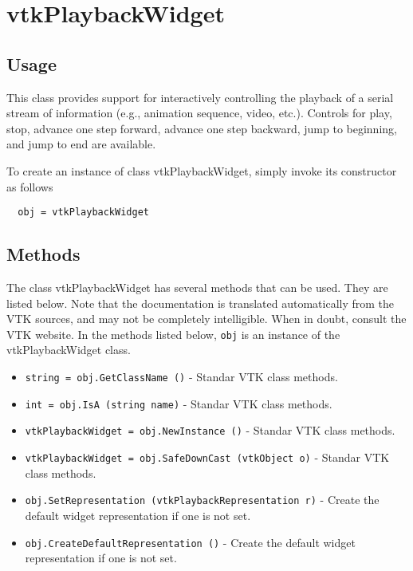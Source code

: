 \section{vtkPlaybackWidget}

\subsection{Usage}

 This class provides support for interactively controlling the playback of
 a serial stream of information (e.g., animation sequence, video, etc.). 
 Controls for play, stop, advance one step forward, advance one step backward, 
 jump to beginning, and jump to end are available. 

To create an instance of class vtkPlaybackWidget, simply
invoke its constructor as follows
\begin{verbatim}
  obj = vtkPlaybackWidget
\end{verbatim}
\subsection{Methods}

The class vtkPlaybackWidget has several methods that can be used.
  They are listed below.
Note that the documentation is translated automatically from the VTK sources,
and may not be completely intelligible.  When in doubt, consult the VTK website.
In the methods listed below, \verb|obj| is an instance of the vtkPlaybackWidget class.
\begin{itemize}
\item  \verb|string = obj.GetClassName ()| -  Standar VTK class methods.

\item  \verb|int = obj.IsA (string name)| -  Standar VTK class methods.

\item  \verb|vtkPlaybackWidget = obj.NewInstance ()| -  Standar VTK class methods.

\item  \verb|vtkPlaybackWidget = obj.SafeDownCast (vtkObject o)| -  Standar VTK class methods.

\item  \verb|obj.SetRepresentation (vtkPlaybackRepresentation r)| -  Create the default widget representation if one is not set. 

\item  \verb|obj.CreateDefaultRepresentation ()| -  Create the default widget representation if one is not set. 

\end{itemize}
